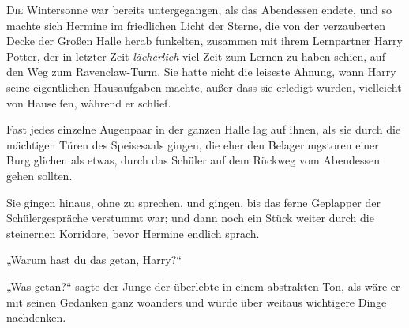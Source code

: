 
\lettrine{D}{ie} Wintersonne war bereits untergegangen, als das Abendessen endete, und so machte sich Hermine im friedlichen Licht der Sterne, die von der verzauberten Decke der Großen Halle herab funkelten, zusammen mit ihrem Lernpartner Harry Potter, der in letzter Zeit \emph{lächerlich} viel Zeit zum Lernen zu haben schien, auf den Weg zum Ravenclaw-Turm. Sie hatte nicht die leiseste Ahnung, wann Harry seine eigentlichen Hausaufgaben machte, außer dass sie erledigt wurden, vielleicht von Hauselfen, während er schlief.

Fast jedes einzelne Augenpaar in der ganzen Halle lag auf ihnen, als sie durch die mächtigen Türen des Speisesaals gingen, die eher den Belagerungstoren einer Burg glichen als etwas, durch das Schüler auf dem Rückweg vom Abendessen gehen sollten.

Sie gingen hinaus, ohne zu sprechen, und gingen, bis das ferne Geplapper der Schülergespräche verstummt war; und dann noch ein Stück weiter durch die steinernen Korridore, bevor Hermine endlich sprach.

„Warum hast du das getan, Harry?“

„Was getan?“ sagte der Junge-der-überlebte in einem abstrakten Ton, als wäre er mit seinen Gedanken ganz woanders und würde über weitaus wichtigere Dinge nachdenken.


